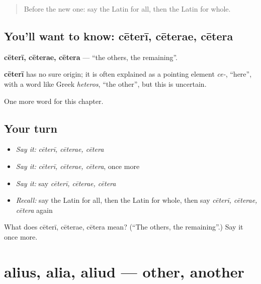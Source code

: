 \label{lesson:LA-C242-ceteri}



\begin{quote}
Before the new one: say the Latin for all, then the Latin for whole.
\end{quote}

\subsection*{You'll want to know: cēterī, cēterae, cētera}
\textbf{cēterī, cēterae, cētera} — \textquotedblleft{}the others, the remaining\textquotedblright{}.

\begin{cousinweb}
\textbf{cēterī} has no sure origin; it is often explained as a pointing element \emph{ce-}, \textquotedblleft{}here\textquotedblright{}, with a word like Greek \emph{heteros}, \textquotedblleft{}the other\textquotedblright{}, but this is uncertain.
\end{cousinweb}

\begin{grammarlens}[title={What you've built}]
One more word for this chapter.
\end{grammarlens}

\subsection*{Your turn}
\begin{itemize}
\raggedright
  \item \emph{Say it:} \emph{cēterī, cēterae, cētera}
  \item \emph{Say it:} \emph{cēterī, cēterae, cētera}, once more
  \item \emph{Say it:} say \emph{cēterī, cēterae, cētera}
  \item \emph{Recall:} say the Latin for all, then the Latin for whole, then say \emph{cēterī, cēterae, cētera} again
\end{itemize}

\begin{tcolorbox}[breakable,colback=teal!4,colframe=teal!35!black,title={Before you move on}]
What does cēterī, cēterae, cētera mean? (\textquotedblleft{}The others, the remaining\textquotedblright{}.) Say it once more.
\end{tcolorbox}
\section[alius, alia, aliud]{alius, alia, aliud — other, another}

